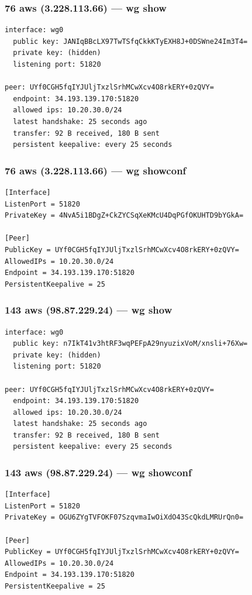 \documentclass[11pt,a4paper]{article}
\begin{document}
\subsubsection*{76 aws (3.228.113.66) — wg show}
\begin{lstlisting}
interface: wg0
  public key: JANIqBBcLX97TwTSfqCkkKTyEXH8J+0DSWne24Im3T4=
  private key: (hidden)
  listening port: 51820

peer: UYf0CGH5fqIYJUljTxzlSrhMCwXcv4O8rkERY+0zQVY=
  endpoint: 34.193.139.170:51820
  allowed ips: 10.20.30.0/24
  latest handshake: 25 seconds ago
  transfer: 92 B received, 180 B sent
  persistent keepalive: every 25 seconds

\end{lstlisting}

\subsubsection*{76 aws (3.228.113.66) — wg showconf}
\begin{lstlisting}
[Interface]
ListenPort = 51820
PrivateKey = 4NvA5i1BDgZ+CkZYCSqXeKMcU4DqPGfOKUHTD9bYGkA=

[Peer]
PublicKey = UYf0CGH5fqIYJUljTxzlSrhMCwXcv4O8rkERY+0zQVY=
AllowedIPs = 10.20.30.0/24
Endpoint = 34.193.139.170:51820
PersistentKeepalive = 25

\end{lstlisting}

\subsubsection*{143 aws (98.87.229.24) — wg show}
\begin{lstlisting}
interface: wg0
  public key: n7IkT41v3htRF3wqPEFpA29nyuzixVoM/xnsli+76Xw=
  private key: (hidden)
  listening port: 51820

peer: UYf0CGH5fqIYJUljTxzlSrhMCwXcv4O8rkERY+0zQVY=
  endpoint: 34.193.139.170:51820
  allowed ips: 10.20.30.0/24
  latest handshake: 25 seconds ago
  transfer: 92 B received, 180 B sent
  persistent keepalive: every 25 seconds

\end{lstlisting}

\subsubsection*{143 aws (98.87.229.24) — wg showconf}
\begin{lstlisting}
[Interface]
ListenPort = 51820
PrivateKey = OGU6ZYgTVFOKF07SzqvmaIwOiXdO43ScQkdLMRUrQn0=

[Peer]
PublicKey = UYf0CGH5fqIYJUljTxzlSrhMCwXcv4O8rkERY+0zQVY=
AllowedIPs = 10.20.30.0/24
Endpoint = 34.193.139.170:51820
PersistentKeepalive = 25

\end{lstlisting}
\end{document}
